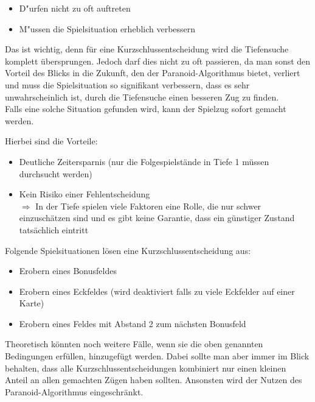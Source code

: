 \documentclass[12pt,a4paper,bibliography=totocnumbered,listof=totocnumbered,ngerman]{scrartcl}
\begin{document}
\begin{itemize}
\item D"urfen nicht zu oft auftreten
\item M"ussen die Spielsituation erheblich verbessern
\end{itemize}

Das ist wichtig, denn für eine Kurzschlussentscheidung wird die Tiefensuche komplett übersprungen. Jedoch darf dies nicht zu oft passieren, da man sonst den Vorteil des \glqq Blicks in die Zukunft\grqq{}, den der Paranoid-Algorithmus bietet, verliert und muss die Spielsituation so signifikant verbessern, dass es sehr unwahrscheinlich ist, durch die Tiefensuche einen besseren Zug zu finden.\\
Falls eine solche Situation gefunden wird, kann der Spielzug sofort gemacht werden.

Hierbei sind die Vorteile:

\begin{itemize}
\item Deutliche Zeitersparnis (nur die Folgespielstände in Tiefe 1 müssen durchsucht werden)
\item Kein Risiko einer Fehlentscheidung\\
	$\Rightarrow$ In der Tiefe spielen viele Faktoren eine Rolle, die nur schwer einzuschätzen sind und es gibt keine Garantie, dass ein günstiger Zustand tatsächlich eintritt 
\end{itemize}

Folgende Spielsituationen lösen eine Kurzschlussentscheidung aus:
	\begin{itemize}
	\item Erobern eines Bonusfeldes
	\item Erobern eines Eckfeldes (wird deaktiviert falls zu viele Eckfelder auf einer Karte)
	\item Erobern eines Feldes mit Abstand 2 zum nächsten Bonusfeld
	\end{itemize}
	
Theoretisch könnten noch weitere Fälle, wenn sie die oben genannten Bedingungen erfüllen, hinzugefügt werden. Dabei sollte man aber immer im Blick behalten, dass alle Kurzschlussentscheidungen kombiniert nur einen kleinen Anteil an allen gemachten Zügen haben sollten. Ansonsten wird der Nutzen des Paranoid-Algorithmus eingeschränkt.
\end{document}
